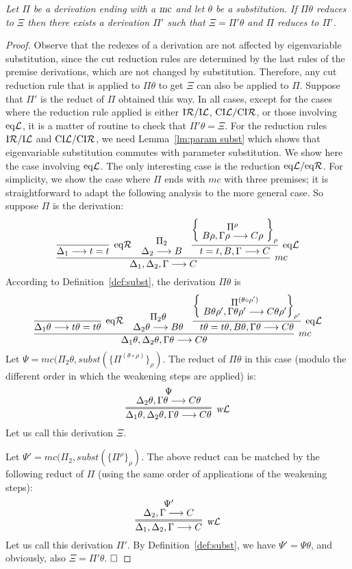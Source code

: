 \documentclass[preprint]{elsarticle}
\newcommand{\Seq}[2]{#1\longrightarrow #2}
\newcommand{\eqL}{{\rm eq}{\cal L}}
\newcommand{\eqR}{{\rm eq}{\cal R}}
\newcommand{\indR}{{\rm I}{\cal R}}
\newcommand{\indL}{{\rm I}{\cal L}}
\newcommand{\coindR}{{\rm CI}{\cal R}}
\newcommand{\coindL}{{\rm CI}{\cal L}}
\newcommand{\mc}{\hbox{\sl mc}}
\newcommand{\wL}{\hbox{\sl w}{\cal L}}
\def\qed{$\hfill\Box$}
\newenvironment{lemmacp}[1]{\noindent {\bf Lemma~\ref{#1}.} \em}{}
\begin{document}
\begin{lemmacp}{lm:reduct_subst}
  Let $\Pi$ be a derivation ending with a $\mc$
  and let $\theta$ be a substitution.  If $\Pi\theta$ reduces to $\Xi$
  then there exists a derivation $\Pi'$ such that $\Xi = \Pi'\theta$
  and $\Pi$ reduces to $\Pi'$.
\end{lemmacp}
\begin{proof}
  Observe that the redexes of a derivation are not affected by
  eigenvariable substitution, since the cut reduction rules are
  determined by the last rules of the premise derivations, which are
  not changed by substitution. Therefore, any cut reduction rule that
  is applied to $\Pi\theta$ to get $\Xi$ can also be applied to
  $\Pi$. Suppose that $\Pi'$ is the reduct of $\Pi$ obtained this
  way. In all cases, except for the cases where the reduction rule
  applied is either $\indR/\indL$, $\coindL/ \coindR$, or those
  involving $\eqL$, it is a matter of routine to check that
  $\Pi'\theta = \Xi$. For the reduction rules $\indR/\indL$ and
  $\coindL/ \coindR$, we need Lemma~\ref{lm:param subst} which shows
  that eigenvariable substitution commutes with parameter
  substitution.  We show here the case involving $\eqL$. The only
  interesting case is the reduction $\eqL/\eqR$. For simplicity, we
  show the case where $\Pi$ ends with $mc$ with three premises; it is
  straightforward to adapt the following analysis to the more general
  case.  So suppose $\Pi$ is the derivation:
$$
\infer[mc]
{\Seq{\Delta_1, \Delta_2, \Gamma}{C} }
{
\infer[\eqR]
{\Seq{\Delta_1}{t = t}}{}
&
\deduce{\Seq{\Delta_2}{B}}{\Pi_2}
& 
\infer[\eqL]
{\Seq{t=t, B, \Gamma}{C}}
{
\left\{
\raisebox{-1.5ex}{ \deduce{\Seq{B\rho, \Gamma\rho}{C\rho}}{\Pi^\rho} }
\right\}_\rho
}
}
$$
According to Definition~\ref{def:subst}, the derivation $\Pi\theta$ is 
$$
\infer[mc]
{\Seq{\Delta_1\theta,\Delta_2\theta, \Gamma\theta}{C\theta} }
{
\infer[\eqR]
{\Seq{\Delta_1\theta}{t\theta = t\theta}}{}
& 
\deduce{\Seq{\Delta_2\theta}{B\theta}}{\Pi_2\theta}
&
\infer[\eqL]
{\Seq{t\theta=t\theta, B\theta, \Gamma\theta}{C\theta}}
{
\left\{
\raisebox{-1.5ex}{ \deduce{\Seq{B\theta\rho', \Gamma\theta\rho'}{C\theta\rho'}}{\Pi^{(\theta\circ \rho')} }}
\right\}_{\rho'}
}
}
$$
Let $\Psi = mc(\Pi_2\theta, subst(\{\Pi^{(\theta\circ \rho)} \}_\rho)$.
The reduct of $\Pi\theta$ in this case (modulo the different
order in which the weakening steps are applied) is:  
$$
\infer=[\wL]
{\Seq{\Delta_1\theta, \Delta_2\theta, \Gamma\theta}{C\theta}}
{
\deduce{\Seq{\Delta_2\theta,\Gamma\theta}{C\theta}}{\Psi}
}
$$
Let us call this derivation $\Xi$.

Let $\Psi' = mc(\Pi_2, subst(\{\Pi^\rho\}_\rho)$. 
The above reduct can be matched by the following reduct of $\Pi$ (using the same
order of applications of the weakening steps): 
$$
\infer=[\wL]
{\Seq{\Delta_1, \Delta_2, \Gamma}{C}}
{
\deduce{\Seq{\Delta_2,\Gamma}{C}}{\Psi'}
}
$$
Let us call this derivation $\Pi'$. 
By Definition~\ref{def:subst}, we have $\Psi' = \Psi\theta$, and
obviously, also $\Xi = \Pi'\theta$.
\qed
\end{proof}
\end{document}
